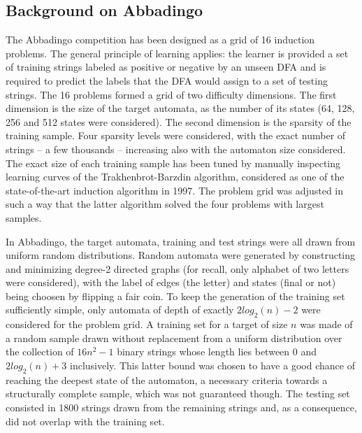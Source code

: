 \subsection{Background on Abbadingo}

The Abbadingo competition has been designed as a grid of 16 induction problems. The general principle of learning applies: the learner is provided a set of training strings labeled as positive or negative by an unseen DFA and is required to predict the labels that the DFA would assign to a set of testing strings. The 16 problems formed a grid of two difficulty dimensions. The first dimension is the size of the target automata, as the number of its states (64, 128, 256 and 512 states were considered). The second dimension is the sparsity of the training sample. Four sparsity levels were considered, with the exact number of strings -- a few thousands -- increasing also with the automaton size considered. The exact size of each training sample has been tuned by manually inspecting learning curves of the Trakhenbrot-Barzdin algorithm, considered as one of the state-of-the-art induction algorithm in 1997. The problem grid was adjusted in such a way that the latter algorithm solved the four problems with largest samples.

In Abbadingo, the target automata, training and test strings were all drawn from uniform random distributions. Random automata were generated by constructing and minimizing degree-2 directed graphs (for recall, only alphabet of two letters were considered), with the label of edges (the letter) and states (final or not) being choosen by flipping a fair coin. To keep the generation of the training set sufficiently simple, only automata of depth of exactly $2log_2(n)-2$ were considered for the problem grid. A training set for a target of size $n$ was made of a random sample drawn without replacement from a uniform distribution over the collection of $16n^2 -1$ binary strings whose length lies between 0 and $2log_2(n)+3$ inclusively. This latter bound was chosen to have a good chance of reaching the deepest state of the automaton, a necessary criteria towards a structurally complete sample, which was not guaranteed though. The testing set consisted in 1800 strings drawn from the remaining strings and, as a consequence, did not overlap with the training set.

